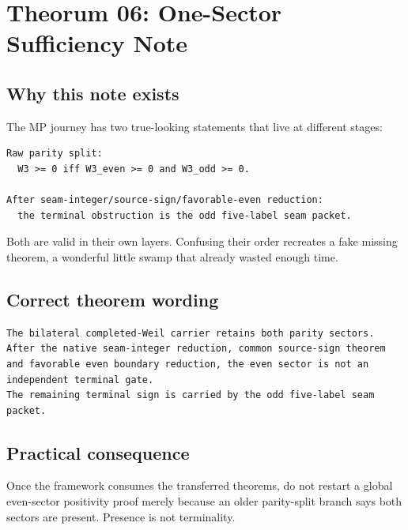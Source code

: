 \hypertarget{theorum-06-one-sector-sufficiency-note}{%
\chapter{Theorum 06: One-Sector Sufficiency Note}\label{theorum-06-one-sector-sufficiency-note}}

\hypertarget{why-this-note-exists}{%
\section{Why this note exists}\label{why-this-note-exists}}

The MP journey has two true-looking statements that live at different stages:

\begin{verbatim}
Raw parity split:
  W3 >= 0 iff W3_even >= 0 and W3_odd >= 0.

After seam-integer/source-sign/favorable-even reduction:
  the terminal obstruction is the odd five-label seam packet.
\end{verbatim}

Both are valid in their own layers. Confusing their order recreates a fake missing theorem, a wonderful little swamp that already wasted enough time.

\hypertarget{correct-theorem-wording}{%
\section{Correct theorem wording}\label{correct-theorem-wording}}

\begin{verbatim}
The bilateral completed-Weil carrier retains both parity sectors.
After the native seam-integer reduction, common source-sign theorem and favorable even boundary reduction, the even sector is not an independent terminal gate.
The remaining terminal sign is carried by the odd five-label seam packet.
\end{verbatim}

\hypertarget{practical-consequence}{%
\section{Practical consequence}\label{practical-consequence}}

Once the framework consumes the transferred theorems, do not restart a global even-sector positivity proof merely because an older parity-split branch says both sectors are present. Presence is not terminality.

